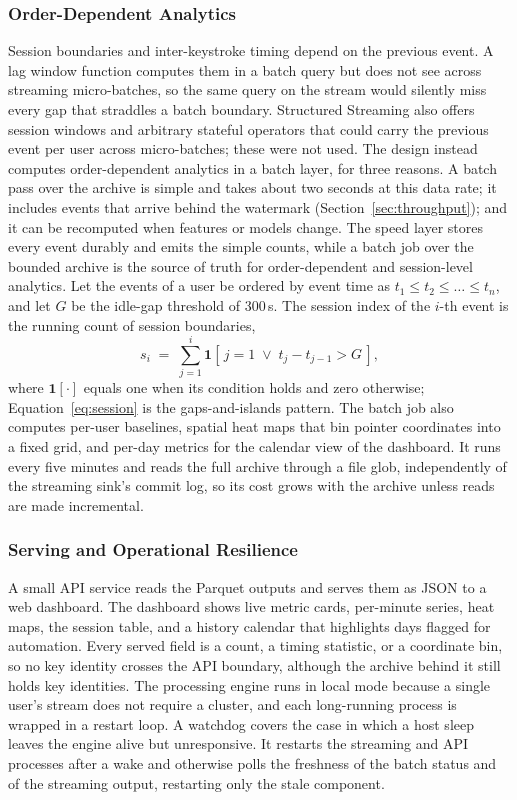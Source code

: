 \documentclass[sensors,article,submit,pdftex,oneauthor]{Definitions/mdpi}
\begin{document}
\subsubsection{Order-Dependent Analytics}
Session boundaries and inter-keystroke timing depend on the previous event. A lag window function computes them in a batch query but does not see across streaming micro-batches, so the same query on the stream would silently miss every gap that straddles a batch boundary. Structured Streaming also offers session windows and arbitrary stateful operators that could carry the previous event per user across micro-batches; these were not used. The design instead computes order-dependent analytics in a batch layer, for three reasons. A batch pass over the archive is simple and takes about two seconds at this data rate; it includes events that arrive behind the watermark (Section~\ref{sec:throughput}); and it can be recomputed when features or models change. The speed layer stores every event durably and emits the simple counts, while a batch job over the bounded archive is the source of truth for order-dependent and session-level analytics. Let the events of a user be ordered by event time as $t_1 \le t_2 \le \dots \le t_n$, and let $G$ be the idle-gap threshold of 300\,s. The session index of the $i$-th event is the running count of session boundaries,
\begin{equation}
s_i \;=\; \sum_{j=1}^{i} \mathbf{1}\!\left[\, j = 1 \;\vee\; t_j - t_{j-1} > G \,\right],
\label{eq:session}
\end{equation}
where $\mathbf{1}[\cdot]$ equals one when its condition holds and zero otherwise; Equation~\eqref{eq:session} is the gaps-and-islands pattern. The batch job also computes per-user baselines, spatial heat maps that bin pointer coordinates into a fixed grid, and per-day metrics for the calendar view of the dashboard. It runs every five minutes and reads the full archive through a file glob, independently of the streaming sink's commit log, so its cost grows with the archive unless reads are made incremental.

\subsubsection{Serving and Operational Resilience}
A small API service reads the Parquet outputs and serves them as JSON to a web dashboard. The dashboard shows live metric cards, per-minute series, heat maps, the session table, and a history calendar that highlights days flagged for automation. Every served field is a count, a timing statistic, or a coordinate bin, so no key identity crosses the API boundary, although the archive behind it still holds key identities. The processing engine runs in local mode because a single user's stream does not require a cluster, and each long-running process is wrapped in a restart loop. A watchdog covers the case in which a host sleep leaves the engine alive but unresponsive. It restarts the streaming and API processes after a wake and otherwise polls the freshness of the batch status and of the streaming output, restarting only the stale component.
\end{document}
